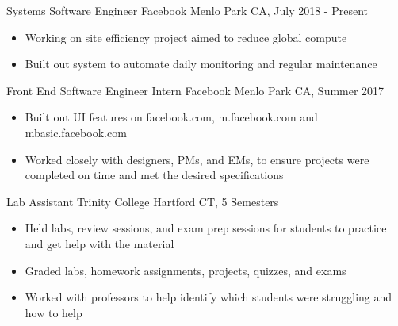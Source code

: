 \documentclass{johnsona_cv}
\begin{document}
\begin{entrylist}

\entry
{Systems Software Engineer}
{Facebook}
{Menlo Park CA, July 2018 - Present}
{
\begin{itemize}
    \item Working on site efficiency project aimed to reduce global compute
    \item Built out system to automate daily monitoring and regular maintenance
\end{itemize}
}

\entry
{Front End Software Engineer Intern}
{Facebook}
{ Menlo Park CA, Summer 2017}
{
\begin{itemize}
    \item Built out UI features on facebook.com, m.facebook.com and mbasic.facebook.com
    \item Worked closely with designers, PMs, and EMs, to ensure projects were completed on time and met the desired specifications
\end{itemize}
}

\entry
{Lab Assistant}
{Trinity College}
{Hartford CT, 5 Semesters}
{
\begin{itemize}
    \item Held labs, review sessions, and exam prep sessions for students to practice and get help with the material
    \item Graded labs, homework assignments, projects, quizzes, and exams
    \item Worked with professors to help identify which students were struggling and how to help
\end{itemize}}

\end{entrylist}
\end{document}
